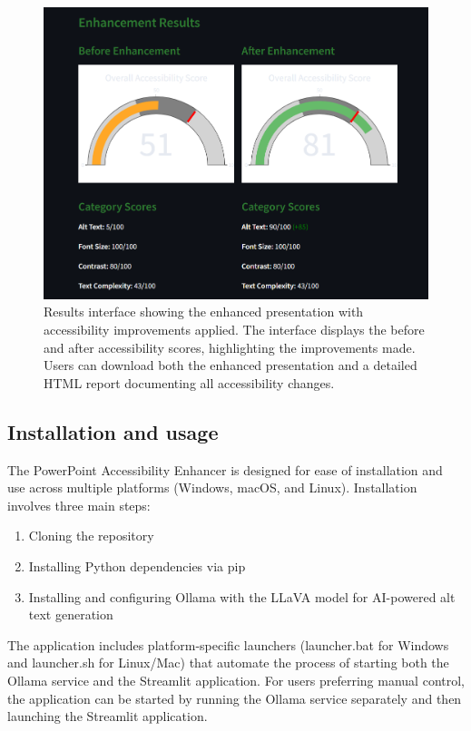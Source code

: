 \documentclass[preprint,review,12pt]{elsarticle} %
\begin{document}
\begin{figure}[h]
    \centering
    \includegraphics[width=\textwidth]{Figures/fig3_ppp.png}
    \caption{Results interface showing the enhanced presentation with accessibility improvements applied. The interface displays the before and after accessibility scores, highlighting the improvements made. Users can download both the enhanced presentation and a detailed HTML report documenting all accessibility changes.}
    \label{fig:result-interface}
\end{figure}

\subsection{Installation and usage}
The PowerPoint Accessibility Enhancer is designed for ease of installation and use across multiple platforms (Windows, macOS, and Linux). Installation involves three main steps:

\begin{enumerate}
    \item Cloning the repository
    \item Installing Python dependencies via pip
    \item Installing and configuring Ollama with the LLaVA model for AI-powered alt text generation
\end{enumerate}

The application includes platform-specific launchers (launcher.bat for Windows and launcher.sh for Linux/Mac) that automate the process of starting both the Ollama service and the Streamlit application. For users preferring manual control, the application can be started by running the Ollama service separately and then launching the Streamlit application.
\end{document}
